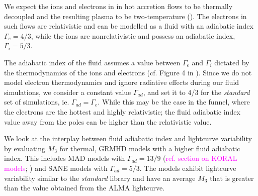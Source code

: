 We expect the ions and electrons in in hot accretion flows to be thermally decoupled and the resulting plasma to be two-temperature (\citealt{1976ApJ...204..187S, Quataert_1998, 10.1093/mnras/stw3116, Ryan_2018}). The electrons in such flows are relativistic and can be modelled as a fluid with an adiabatic index $\Gamma_{e}=4/3$, while the ions are nonrelativistic and possess an adiabatic index, $\Gamma_{i}=5/3$.

The adiabatic index of the fluid assumes a value between $\Gamma_{e}$ and $\Gamma_{i}$ dictated by the thermodynamics of the ions and electrons (cf. Figure 4 in \citealt{10.1093/mnras/stw3116}). Since we do not model electron thermodynamics and ignore radiative effects during our fluid simulations, we consider a constant value $\Gamma_{ad}$, and set it to 4/3 for the \textit{standard} set of simulations, ie. $\Gamma_{ad}=\Gamma_{e}$. While this may be the case in the funnel, where the electrons are the hottest and highly relativistic; the fluid adiabatic index value away from the poles can be higher than the relativistic value.

We look at the interplay between fluid adiabatic index and lightcurve variability by evaluating $M_{3}$ for thermal, GRMHD models with a higher fluid adiabatic index. This includes MAD models with $\Gamma_{ad}=13/9$ (\textcolor{magenta}{ref. section on KORAL models}; \citealt{2021arXiv210812380N}) and SANE models with $\Gamma_{ad}=5/3$. The models exhibit lightcurve variability similar to the \textit{standard} library and have an average $M_{3}$ that is greater than the value obtained from the ALMA lightcurve. 
